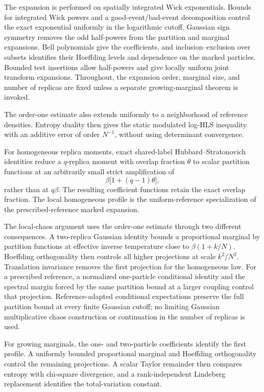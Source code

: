 \documentclass[11pt,reqno]{amsart}
\numberwithin{equation}{section}
\theoremstyle{plain}
\theoremstyle{definition}
\newcommand{\be}{\beta}
\begin{document}
The expansion is performed on spatially integrated Wick exponentials. Bounds for integrated Wick powers and a good-event/bad-event decomposition control the exact exponential uniformly in the logarithmic cutoff. Gaussian sign symmetry removes the odd half-powers from the partition and marginal expansions. Bell polynomials give the coefficients, and inclusion--exclusion over subsets identifies their Hoeffding levels and dependence on the marked particles. Bounded test insertions allow half-powers and give locally uniform joint transform expansions. Throughout, the expansion order, marginal size, and number of replicas are fixed unless a separate growing-marginal theorem is invoked.


The order-one estimate also extends uniformly to a neighborhood of reference densities. Entropy duality then gives the static modulated log-HLS inequality with an additive error of order $N^{-1}$, without using determinant convergence.

For homogeneous replica moments, exact shared-label Hubbard--Stratonovich identities reduce a $q$-replica moment with overlap fraction $\theta$ to scalar partition functions at an arbitrarily small strict amplification of
\begin{equation}
 \be\bigl[1+(q-1)\theta\bigr],
 \label{eq:intro-replica-effective-coupling}
\end{equation}
rather than at $q\be$.  The resulting coefficient functions retain the exact overlap fraction. The local homogeneous profile is the uniform-reference specialization of the prescribed-reference marked expansion.

The local-chaos argument uses the order-one estimate through two different consequences. A two-replica Gaussian identity bounds a proportional marginal by partition functions at effective inverse temperature close to $\be(1+k/N)$. Hoeffding orthogonality then controls all higher projections at scale $k^2/N^2$. Translation invariance removes the first projection for the homogeneous law. For a prescribed reference, a normalized one-particle conditional identity and the spectral margin forced by the same partition bound at a larger coupling control that projection. Reference-adapted conditional expectations preserve the full partition bound at every finite Gaussian cutoff; no limiting Gaussian multiplicative chaos construction or continuation in the number of replicas is used.

For growing marginals, the one- and two-particle coefficients identify the first profile. A uniformly bounded proportional marginal and Hoeffding orthogonality control the remaining projections. A scalar Taylor remainder then compares entropy with chi-square divergence, and a rank-independent Lindeberg replacement identifies the total-variation constant.
\end{document}
